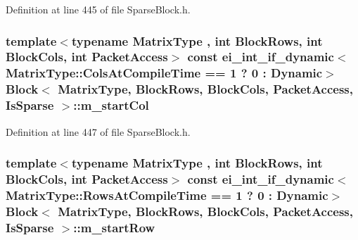 Definition at line 445 of file Sparse\-Block.\-h.

\hypertarget{class_block_3_01_matrix_type_00_01_block_rows_00_01_block_cols_00_01_packet_access_00_01_is_sparse_01_4_ad2ba05e47f339d5c74d6e46cbd089e22}{
\subsubsection[{m\-\_\-start\-Col}]{\setlength{\rightskip}{0pt plus 5cm}template$<$typename Matrix\-Type , int Block\-Rows, int Block\-Cols, int Packet\-Access$>$ const ei\-\_\-int\-\_\-if\-\_\-dynamic$<$Matrix\-Type\-::\-Cols\-At\-Compile\-Time == 1 ? 0 \-: {\bf Dynamic}$>$ {\bf Block}$<$ Matrix\-Type, Block\-Rows, Block\-Cols, Packet\-Access, {\bf Is\-Sparse} $>$\-::m\-\_\-start\-Col\hspace{0.3cm}{\ttfamily [protected]}}}\label{class_block_3_01_matrix_type_00_01_block_rows_00_01_block_cols_00_01_packet_access_00_01_is_sparse_01_4_ad2ba05e47f339d5c74d6e46cbd089e22}


Definition at line 447 of file Sparse\-Block.\-h.

\hypertarget{class_block_3_01_matrix_type_00_01_block_rows_00_01_block_cols_00_01_packet_access_00_01_is_sparse_01_4_abe05988121d3fe7a31b2634f25802976}{
\subsubsection[{m\-\_\-start\-Row}]{\setlength{\rightskip}{0pt plus 5cm}template$<$typename Matrix\-Type , int Block\-Rows, int Block\-Cols, int Packet\-Access$>$ const ei\-\_\-int\-\_\-if\-\_\-dynamic$<$Matrix\-Type\-::\-Rows\-At\-Compile\-Time == 1 ? 0 \-: {\bf Dynamic}$>$ {\bf Block}$<$ Matrix\-Type, Block\-Rows, Block\-Cols, Packet\-Access, {\bf Is\-Sparse} $>$\-::m\-\_\-start\-Row\hspace{0.3cm}{\ttfamily [protected]}}}\label{class_block_3_01_matrix_type_00_01_block_rows_00_01_block_cols_00_01_packet_access_00_01_is_sparse_01_4_abe05988121d3fe7a31b2634f25802976}


